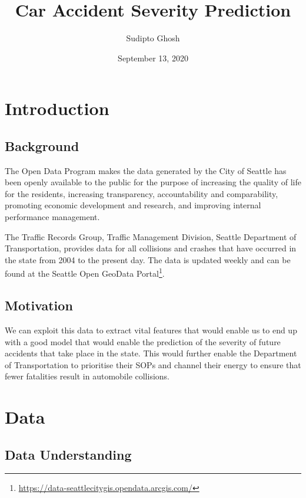 \documentclass{article}
\begin{document}
\title{Car Accident Severity Prediction}
\author{Sudipto Ghosh}
\date{September 13, 2020}
\maketitle

\section{Introduction}

\subsection{Background}

The Open Data Program makes the data generated by the City of Seattle has been openly available to the public for the purpose of increasing the quality of life for the residents, increasing transparency, accountability and comparability, promoting economic development and research, and improving internal performance management.

The Traffic Records Group, Traffic Management Division, Seattle Department of Transportation, provides data for all collisions and crashes that have occurred in the state from 2004 to the present day. The data is updated weekly and can be found at the Seattle Open GeoData Portal\footnote[1]{\href{https://data-seattlecitygis.opendata.arcgis.com/}{https://data-seattlecitygis.opendata.arcgis.com/}}.

\subsection{Motivation}

We can exploit this data to extract vital features that would enable us to end up with a good model that would enable the prediction of the severity of future accidents that take place in the state. This would further enable the Department of Transportation to prioritise their SOPs and channel their energy to ensure that fewer fatalities result in automobile collisions.

\section{Data}

\subsection{Data Understanding}
\end{document}
